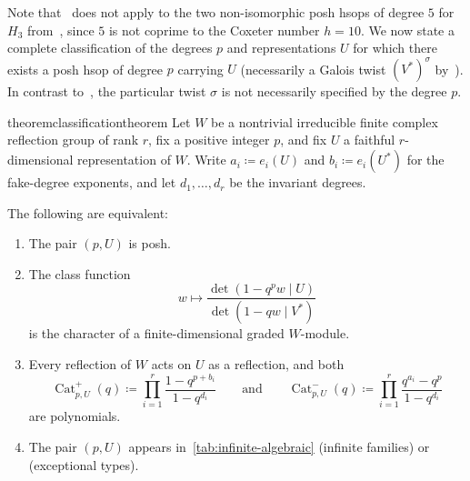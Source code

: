 \documentclass[10pt,a4paper]{amsart}
\newcommand{\defeq}{\coloneqq}
\newcommand{\operatorstyle}{\textstyle}
\DeclareMathOperator{\Cat}{Cat}
\theoremstyle{definition}
\newcommand{\nathan}[1]{\todo[size=\tiny,color=green!30]{#1 \\ \hfill --- N.}}
\begin{document}
Note that~ does not apply to the two non-isomorphic posh hsops of degree $5$ for $H_3$ from~, since $5$ is not coprime to the Coxeter number $h=10$.  We now state a complete classification of the degrees $p$ and representations $U$ for which there exists a posh hsop of degree $p$ carrying $U$ (necessarily a Galois twist $(V^*)^\sigma$ by~).  In contrast to~, the particular twist $\sigma$ is not necessarily specified by the degree $p$.


\begin{restatable}{theorem}{classificationtheorem}\label{c:thm:main}
Let $W$ be a nontrivial irreducible finite complex reflection group of rank $r$,
fix a positive integer $p$, and fix $U$ a faithful $r$-dimensional
representation of $W$. Write $a_i\defeq e_i(U)$ and
$b_i\defeq e_i(U^*)$ for the fake-degree exponents, and let
$d_1,\ldots,d_r$ be the invariant degrees. 

The following are
equivalent:
\begin{enumerate}
\item The pair $(p,U)$ is posh.
\item The class function
\[
 w\longmapsto\frac{\det(1-q^p w\mid U)}{\det(1-qw\mid V^*)}
\]
is the character of a finite-dimensional graded $W$-module.
\item Every reflection of $W$ acts on $U$ as a reflection, and both
\begin{equation*}
 \operatorstyle
 \Cat^+_{p,U}(q)\defeq\prod\limits_{i=1}^r\frac{1-q^{p+b_i}}{1-q^{d_i}}
 \qquad\text{and}\qquad
 \Cat^-_{p,U}(q)\defeq\prod\limits_{i=1}^r
                              \frac{q^{a_i}-q^p}{1-q^{d_i}}
\end{equation*}
are polynomials.
\item The pair $(p,U)$ appears in~\cref{tab:infinite-algebraic} (infinite families) or~ (exceptional types).%
\end{enumerate}
\end{restatable}


\end{document}
